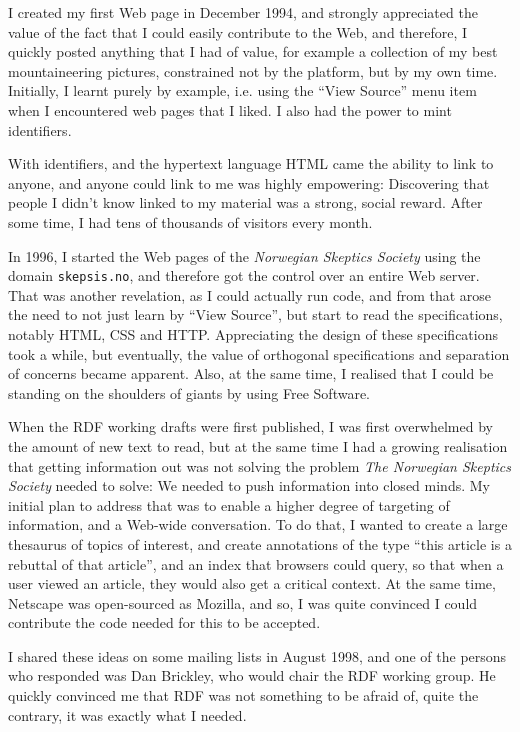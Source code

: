 I created my first Web page in December 1994, and strongly appreciated
the value of the fact that I could easily contribute to the Web, and
therefore, I quickly posted anything that I had of value, for example
a collection of my best mountaineering pictures, constrained not by
the platform, but by my own time. Initially, I learnt purely by
example, i.e. using the ``View Source'' menu item when I encountered
web pages that I liked. I also had the power to mint identifiers. 

With identifiers, and the hypertext language HTML came the ability to
link to anyone, and anyone could link to me was highly empowering:
Discovering that people I didn't know linked to my material was a
strong, social reward. After some time, I had tens of thousands of
visitors every month.

In 1996, I started the Web pages of the \textit{Norwegian Skeptics
  Society} using the domain
\texttt{skepsis.no}, and therefore got the control over an entire Web
server. That was another revelation, as I could actually run code, and
from that arose the need to not just learn by ``View Source'', but
start to read the specifications, notably HTML, CSS and
HTTP. Appreciating the design of these specifications took a while,
but eventually, the value of orthogonal specifications and separation
of concerns became apparent. Also, at the same time, I realised that I
could be standing on the shoulders of giants by using Free Software.

When the RDF working drafts were first published, I was first
overwhelmed by the amount of new text to read, but at the same time I
had a growing realisation that getting information out was not solving
the problem \textit{The Norwegian Skeptics Society} needed to solve: We needed
to push information into closed minds. My initial plan to address that
was to enable a higher degree of targeting of information, and a Web-wide
conversation. To do that, I wanted to create a large thesaurus of
topics of interest, and create annotations of the type ``this article
is a rebuttal of that article'', and an index that browsers could
query, so that when a user viewed an article, they would also get a
critical context. At the same time, Netscape was open-sourced as
Mozilla, and so, I was quite convinced I could contribute the code
needed for this to be accepted. 

I shared these ideas on some mailing lists in August 1998, and one of
the persons who responded was Dan Brickley, who would chair the RDF
working group. He quickly convinced me that RDF was not something to
be afraid of, quite the contrary, it was exactly what I needed.

